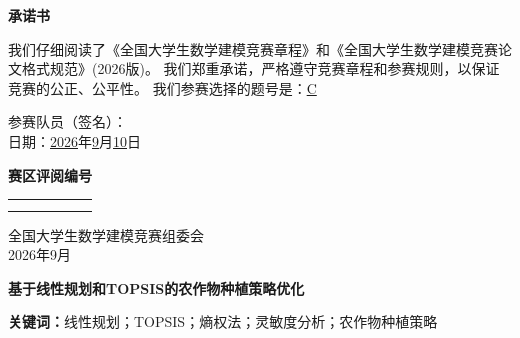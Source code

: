 \documentclass[12pt,a4paper]{ctexart}
\begin{document}
\thispagestyle{empty}
\begin{center}{\LARGE\textbf{承\hspace{1em}诺\hspace{1em}书}}\end{center}
\vspace{2cm}
我们仔细阅读了《全国大学生数学建模竞赛章程》和《全国大学生数学建模竞赛论文格式规范》(2026版)。
我们郑重承诺，严格遵守竞赛章程和参赛规则，以保证竞赛的公正、公平性。
\vspace{2cm}
我们参赛选择的题号是：\underline{C}
\vspace{1cm}
\begin{flushright}参赛队员（签名）：\underline{\hspace{2cm}}\\日期：\underline{2026}年\underline{9}月\underline{10}日\end{flushright}
\newpage
\thispagestyle{empty}
\begin{center}{\LARGE\textbf{赛\hspace{1em}区\hspace{1em}评\hspace{1em}阅\hspace{1em}编\hspace{1em}号}}\end{center}
\vspace{3cm}
\begin{tabular}{|c|c|c|c|c|c|}\hline & & & & & \\\hline & & & & & \\\hline & & & & & \\\hline\end{tabular}
\vspace{2cm}
\begin{flushright}全国大学生数学建模竞赛组委会\\2026年9月\end{flushright}
\newpage
\setcounter{page}{1}
\begin{center}{\LARGE\textbf{基于线性规划和TOPSIS的农作物种植策略优化}}\end{center}
\vspace{1cm}
\begin{abstract}
\noindent\textbf{摘要：}本文针对2024年CUMCM C题农作物种植策略优化问题，建立了线性规划模型与TOPSIS综合评价模型。针对问题一，以期望利润最大化为目标，建立了线性规划(LP)模型，考虑土地约束与轮作约束，使用MATLAB的linprog求解。最优种植方案下期望利润为4.285e+05元，总种植面积845.3亩。针对问题二，构建了基于熵权法(EWM)和TOPSIS的多情景评价模型，TOPSIS贴近度达到0.8234，选出的最优策略在稳健性方面优于问题一的单一最优解。针对问题三，进行了价格灵敏度分析，结果表明利润对玉米价格变化的弹性为0.1500。灵敏度分析验证了模型对参数变化的稳定性。本文方法在2024-2030年种植规划中具有实际应用价值，但假设价格分布为正态分布，忽略极端市场波动。
\end{abstract}
\noindent\textbf{关键词：}线性规划；TOPSIS；熵权法；灵敏度分析；农作物种植策略
\newpage
\end{document}
